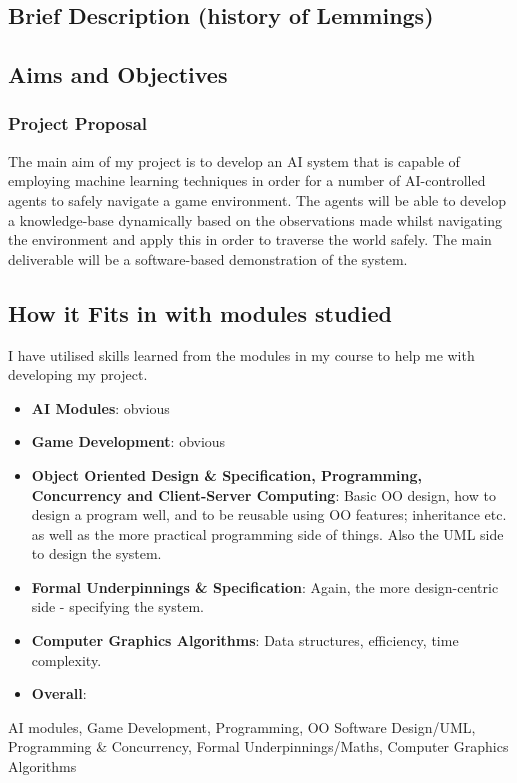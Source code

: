 \documentclass[runningheads,a4paper]{llncs}
\begin{document}
	\subsection{Brief Description (history of Lemmings)}
	\subsection{Aims and Objectives}
		\subsubsection{Project Proposal} The main aim of my project is to develop an AI system that is capable of employing machine learning techniques in order for a number of AI-controlled agents to safely navigate a game environment. The agents will be able to develop a knowledge-base dynamically based on the observations made whilst navigating the environment and apply this in order to traverse the world safely. The main deliverable will be a software-based demonstration of the system.
	
	\subsection{How it Fits in with modules studied}
	
	I have utilised skills learned from the modules in my course to help me with developing my project.
	
		\begin{itemize}
			\item \textbf{AI Modules}: obvious
			\item \textbf{Game Development}: obvious
			\item \textbf{Object Oriented Design \& Specification, Programming, Concurrency and Client-Server Computing}: Basic OO design, how to design a program well, and to be reusable using OO features; inheritance etc. as well as the more practical programming side of things. Also the UML side to design the system.
			\item \textbf{Formal Underpinnings \& Specification}:  Again, the more design-centric side - specifying the system.
			\item \textbf{Computer Graphics Algorithms}: Data structures, efficiency, time complexity.
			\item \textbf{Overall}: 
		\end{itemize}
	AI modules, Game Development, Programming, OO Software Design/UML, Programming \& Concurrency, Formal Underpinnings/Maths, Computer Graphics Algorithms
\end{document}
